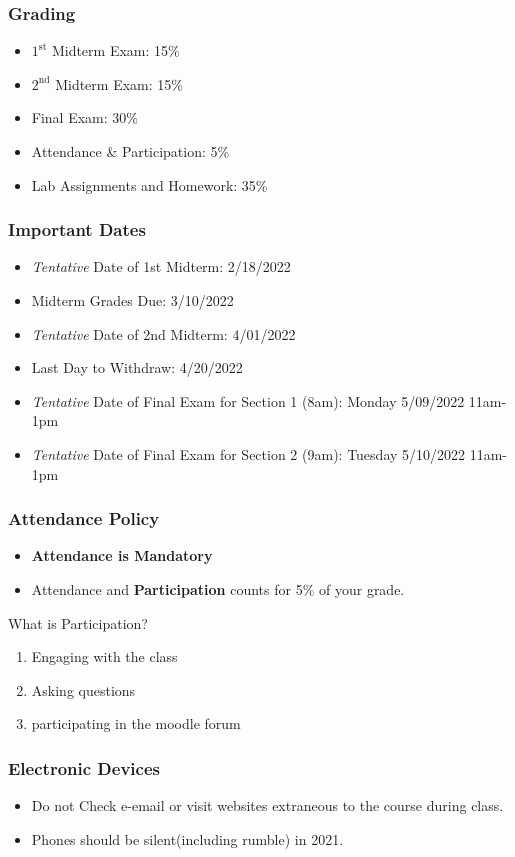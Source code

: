 \documentclass[17pt]{beamer}
\begin{document}
\begin{frame}
	\frametitle{Grading}
		\begin{itemize}
			\item $1^\text{st}$ Midterm Exam: 15\%
			\item $2^\text{nd}$ Midterm Exam: 15\%
			\item Final Exam: 30\%
			\item Attendance \& Participation: 5\% 
			\item Lab Assignments and Homework: 35\%
		\end{itemize}
\end{frame}
\begin{frame}
	\frametitle{Important Dates}
	\begin{itemize}
		\item \textit{Tentative} Date of 1st Midterm: 2/18/2022
		\item Midterm Grades Due: 3/10/2022
		\item \textit{Tentative} Date of 2nd Midterm: 4/01/2022 
		\item Last Day to Withdraw: 4/20/2022
		\item \textit{Tentative} Date of Final Exam for Section 1 (8am): Monday 5/09/2022 11am-1pm
		\item \textit{Tentative} Date of Final Exam for Section 2 (9am): Tuesday 5/10/2022 11am-1pm
	\end{itemize}
\end{frame}
\begin{frame}
	\frametitle{Attendance Policy}
	\begin{itemize}
		\item \textbf{Attendance is Mandatory}
		\item Attendance and \textbf{Participation} counts for 5\% of your grade.
	\end{itemize}
What is Participation?
\begin{enumerate}
	\item Engaging with the class
	\item Asking questions
	\item participating in the moodle forum
\end{enumerate}
\end{frame}
\begin{frame}
	\frametitle{Electronic Devices}
	\begin{itemize}
		\item Do not Check e-email or visit websites extraneous to the course during class.
		\item Phones should be silent(including rumble) in 2021. 
	\end{itemize}
\end{frame}
\end{document}
